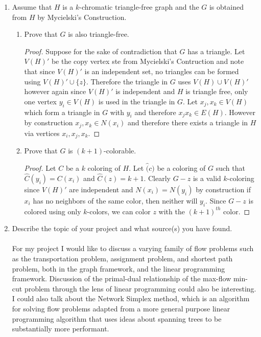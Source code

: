 \documentclass[12pt]{article}
\begin{document}
\begin{enumerate}
	
	\item Assume that $H$ is a $k$-chromatic triangle-free graph and the $G$ is obtained from $H$ by Mycielski's Construction.
	\begin{enumerate}
	\item Prove that $G$ is also triangle-free.
	\begin{proof} Suppose for the sake of contradiction that $G$ has a triangle. Let $V(H)'$ be the copy vertex ste from Mycielski's Contruction and note that since $V(H)'$ is an independent set, no triangles can be formed using $V(H)' \cup \{z\}$. Therefore the triangle in $G$ uses $V(H) \cup V(H)'$ however again since $V(H)'$ is independent and $H$ is triangle free, only one vertex $y_i \in V(H)$ is used in the triangle in $G$. Let $x_j, x_k \in V(H)$ which form a triangle in $G$ with $y_i$ and therefore $x_jx_k \in E(H)$. However by construction $x_j, x_k \in N(x_i)$ and therefore there exists a triangle in $H$ via vertices $x_i, x_j, x_k$. 
	\end{proof}
	\item Prove that $G$ is $(k+1)$-colorable.
	\begin{proof} Let $C$ be a $k$ coloring of $H$. Let $\hat(c)$ be a coloring of $G$ such that $\hat{C}(y_i) = C(x_i)$ and $\hat{C}(z) = k+1$. Clearly $G - z$ is a valid $k$-coloring since $V(H)'$ are independent and $N(x_i) = N(y_i)$ by construction if $x_i$ has no neighbors of the same color, then neither will $y_i$. Since $G-z$ is colored using only $k$-colors, we can color $z$ with the $(k + 1)^{th}$ color.
	\end{proof}
	\end{enumerate}
	\newpage
	
	
	
	
	\item Describe the topic of your project and what source(s) you have found.\\ \\
	For my project  I would like to discuss a varying family of flow problems such as the transportation problem, assignment problem, and shortest path problem, both in the graph framework, and the linear programming framework. Discussion of the primal-dual relationship of the max-flow min-cut problem through the lens of linear programming could also be interesting. I could also talk about the Network Simplex method, which is an algorithm for solving flow problems adapted from a more general purpose linear programming algorithm that uses ideas about spanning trees to be substantially more performant. 


\end{enumerate}
\end{document}
